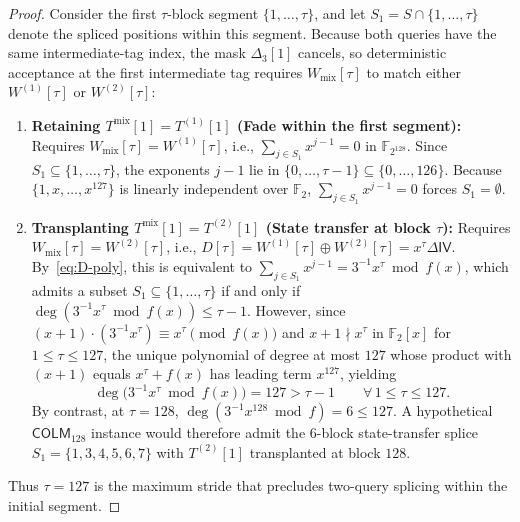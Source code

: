\documentclass[11pt,a4paper]{article}
\theoremstyle{definition}
\theoremstyle{remark}
\newcommand{\Ftwo}{\mathbb{F}_2}
\newcommand{\FtwoN}{\mathbb{F}_{2^{128}}}
\newcommand{\COLM}{\mathsf{COLM}}
\newcommand{\IV}{\mathsf{IV}}
\begin{document}
\begin{proof}
Consider the first $\tau$-block segment $\{1, \dots, \tau\}$, and let $S_1 = S \cap \{1, \dots, \tau\}$ denote the spliced positions within this segment. Because both queries have the same intermediate-tag index, the mask $\Delta_3[1]$ cancels, so deterministic acceptance at the first intermediate tag requires $W_{\mathrm{mix}}[\tau]$ to match either $W^{(1)}[\tau]$ or $W^{(2)}[\tau]$:
\begin{enumerate}[leftmargin=2em]
    \item \textbf{Retaining $T^{\mathrm{mix}}[1] = T^{(1)}[1]$ (Fade within the first segment):} Requires $W_{\mathrm{mix}}[\tau] = W^{(1)}[\tau]$, i.e., $\sum_{j \in S_1} x^{j-1} = 0$ in $\FtwoN$. Since $S_1 \subseteq \{1, \dots, \tau\}$, the exponents $j - 1$ lie in $\{0, \dots, \tau - 1\} \subseteq \{0, \dots, 126\}$. Because $\{1, x, \dots, x^{127}\}$ is linearly independent over $\Ftwo$, $\sum_{j \in S_1} x^{j-1} = 0$ forces $S_1 = \emptyset$.
    \item \textbf{Transplanting $T^{\mathrm{mix}}[1] = T^{(2)}[1]$ (State transfer at block $\tau$):} Requires $W_{\mathrm{mix}}[\tau] = W^{(2)}[\tau]$, i.e., $D[\tau] = W^{(1)}[\tau] \oplus W^{(2)}[\tau] = x^\tau \Delta\IV$. By~\eqref{eq:D-poly}, this is equivalent to $\sum_{j \in S_1} x^{j-1} = 3^{-1} x^\tau \bmod f(x)$, which admits a subset $S_1 \subseteq \{1, \dots, \tau\}$ if and only if $\deg(3^{-1} x^\tau \bmod f(x)) \le \tau - 1$. However, since $(x+1) \cdot (3^{-1} x^\tau) \equiv x^\tau \pmod{f(x)}$ and $x + 1 \nmid x^\tau$ in $\Ftwo[x]$ for $1 \le \tau \le 127$, the unique polynomial of degree at most $127$ whose product with $(x+1)$ equals $x^\tau + f(x)$ has leading term $x^{127}$, yielding
    \begin{equation}
    \deg\big(3^{-1} x^\tau \bmod f(x)\big) = 127 > \tau - 1 \qquad \forall \, 1 \le \tau \le 127.
    \end{equation}
    By contrast, at $\tau = 128$, $\deg(3^{-1} x^{128} \bmod f) = 6 \le 127$. A hypothetical $\COLM_{128}$ instance would therefore admit the $6$-block state-transfer splice $S_1 = \{1, 3, 4, 5, 6, 7\}$ with $T^{(2)}[1]$ transplanted at block $128$.
\end{enumerate}
Thus $\tau = 127$ is the maximum stride that precludes two-query splicing within the initial segment.
\end{proof}
\end{document}
